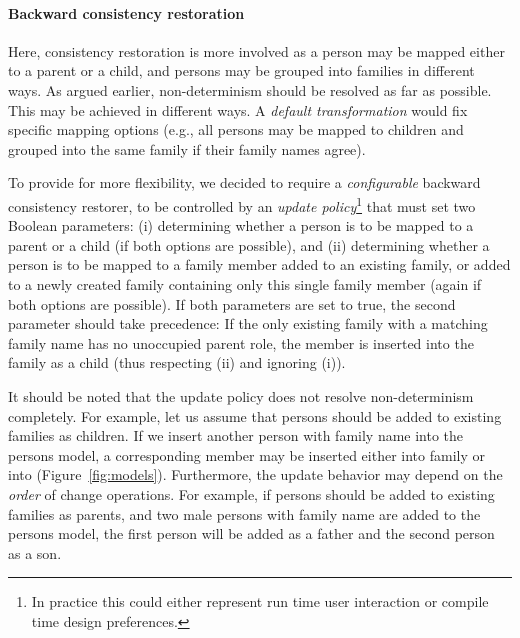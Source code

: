 \paragraph{Backward consistency restoration}

Here, consistency res\-to\-ra\-tion is more involved as a person may be mapped either to a parent or a child, and persons may be grouped into families in different ways. As argued earlier, non-determinism should be resolved as far as possible. This may be achieved in different ways. A \emph{default transformation} would fix specific mapping options (e.g., all persons may be mapped to children and grouped into the same family if their family names agree). 



To provide for more flexibility, we decided to require a \emph{configurable} backward consistency restorer, to be controlled by an \emph{update policy}\footnote{In practice this could either represent run time user interaction or compile time design preferences.} that must set two Boolean parameters:
(i)  determining whether a person is to be mapped to a parent or a child (if both options are possible), and (ii)  determining whether a person is to be mapped to a family member added to an existing family, or added to a newly created family containing only this single family member (again if both options are possible). 
If both parameters are set to true, the second parameter should take precedence: If the only existing family with a matching family name has no unoccupied parent role, the member is inserted into the family as a child (thus respecting (ii) and ignoring (i)).

It should be noted that the update policy does not resolve non-determinism completely. For example, let us assume that persons should be added to existing families as children. If we insert another person with family name  into the persons model, a corresponding member may be inserted either into family  or into  (Figure~\ref{fig:models}). Furthermore, the update behavior may depend on the \emph{order} of change operations. For example, if persons should be added to existing families as parents, and two male persons with family name  are added to the persons model, the first person will be added as a father and the second person as a son. 

